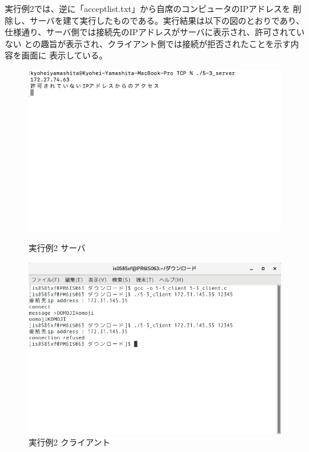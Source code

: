 \documentclass[dvipdfmx,autodetect-engine,titlepage]{jsarticle}
\begin{document}
  実行例2では、逆に「acceptlist.txt」から自席のコンピュータのIPアドレスを
  削除し、サーバを建て実行したものである。実行結果は以下の図のとおりであり、
  仕様通り、サーバ側では接続先のIPアドレスがサーバに表示され、許可されていない
  との趣旨が表示され、クライアント側では接続が拒否されたことを示す内容を画面に
  表示している。


  \begin{figure}[h]
    \centering
    \begin{minipage}[b]{0.45\linewidth}
    \begin{center}
      \includegraphics[keepaspectratio,scale=0.45]{pic4.png}
      \end{center}
      \caption{実行例2 サーバ}
    \end{minipage}
    \begin{minipage}[b]{0.45\linewidth}
    \begin{center}
      \includegraphics[keepaspectratio,scale=0.35]{pic2.png}
      \end{center}
      \caption{実行例2 クライアント}
    \end{minipage}
  \end{figure}
\end{document}
